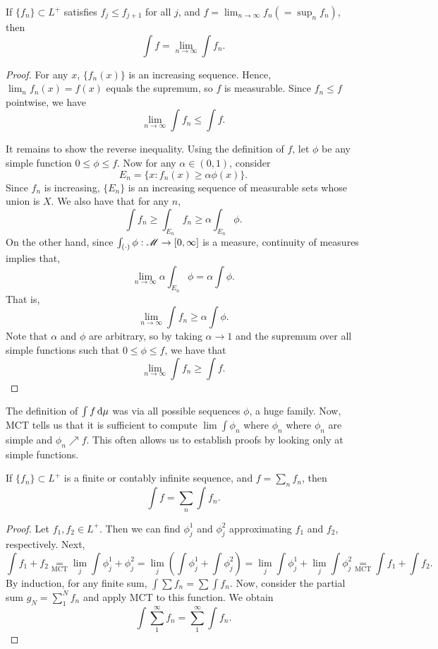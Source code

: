 \documentclass[12pt]{article} %
\begin{document}
\begin{theorem}
    If $\{f_n\} \subset L^+$ satisfies $f_j \leq f_{j+1}$ for all $j$, and $f = \lim_{n \to \infty} f_n (= \sup_n f_n)$, then \[\int f = \lim_{n \to \infty} \int f_n.\]
\end{theorem}

\begin{proof}
    For any $x$, $\{f_n(x)\}$ is an increasing sequence. Hence, $\lim_n f_n(x) = f(x)$ equals the supremum, so $f$ is measurable. Since $f_n \leq f$ pointwise, we have \[\lim_{n \to \infty} \int f_n \leq \int f.\]

    It remains to show the reverse inequality. Using the definition of $f$, let $\phi$ be any simple function $0 \leq \phi \leq f$. Now for any $\alpha \in (0,1)$, consider \[E_n = \{x : f_n(x) \geq \alpha \phi(x)\} .\] Since $f_n$ is increasing, $\{E_n\}$ is an increasing sequence of measurable sets whose union is $X$. We also have that for any $n$, \[\int f_n \geq \int_{E_n} f_n \geq \alpha \int_{E_n} \phi.\] On the other hand, since $\int_{(\cdot)}\phi : \mathscr{M} \to [0,\infty]$ is a measure, continuity of measures implies that, \[\lim_{n \to \infty} \alpha \int_{E_n} \phi = \alpha \int \phi.\] That is, \[\lim_{n \to \infty} \int f_n \geq \alpha \int \phi.\] Note that $\alpha$ and $\phi$ are arbitrary, so by taking $\alpha \to 1$ and the supremum over all simple functions such that $0 \leq \phi \leq f$, we have that \[\lim_{n \to \infty} \int f_n \geq \int f.\]
\end{proof}

\begin{remark}
    The definition of $\int f \, \mathrm{d} \mu$ was via all possible sequences $\phi$, a huge family. Now, MCT tells us that it is sufficient to compute $\lim \int \phi_n$ where $\phi_n$ where $\phi_n$ are simple and $\phi_n \nearrow f$. This often allows us to establish proofs by looking only at simple functions.
\end{remark}

\begin{theorem}
    If $\{f_n\} \subset L^+$ is a finite or contably infinite sequence, and $f = \sum_n f_n$, then \[\int f = \sum_n \int f_n.\]
\end{theorem}

\begin{proof}
    Let $f_1, f_2 \in L^+$. Then we can find $\phi_j^1$ and $\phi_j^2$ approximating $f_1$ and $f_2$, respectively. Next, \[\int f_1 + f_2 \underset{\text{MCT}}{=} \lim_j \int \phi_j^1 + \phi_j^2 = \lim_j \left( \int \phi_j^1 + \int \phi_j^2 \right) = \lim_j \int \phi_j^1 + \lim_j \int \phi_j^2 \underset{\text{MCT}}{=} \int f_1 + \int f_2.\] By induction, for any finite sum, $\int \sum f_n = \sum \int f_n$. Now, consider the partial sum $g_N = \sum_1^N f_n$ and apply MCT to this function. We obtain \[\int \sum_1^\infty f_n = \sum_1^\infty \int f_n.\]
\end{proof}
\end{document}
